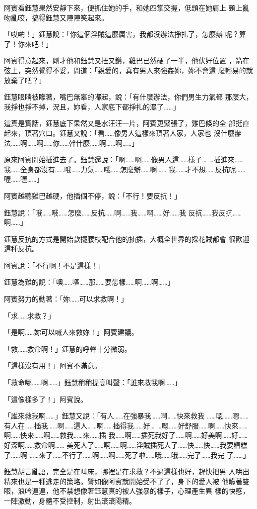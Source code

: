 阿賓看鈺慧果然安靜下來，便抓住她的手，和她四掌交握，低頭在她肩上
頸上亂吻亂咬，搞得鈺慧又陣陣笑起來。

「哎喲！」鈺慧說：「你這個淫賊這麼厲害，我都沒辦法掙扎了，怎麼辦
呢？算了！你來吧！」

阿賓得意起來，剛才他和鈺慧又扭又鑽，雞巴已然硬了一半，他伏好位置
，箭在弦上，突然覺得不妥，問道：「親愛的，真有男人來強姦妳，妳不會這
麼輕易的就放棄了吧？」

鈺慧眼睛被矇著，嘴巴無辜的嘟起，說：「有什麼辦法，你們男生力氣都
那麼大，我掙也掙不掉，況且，妳看，人家底下都掙扎的濕了……」

這真是實話，鈺慧底下果然又是水汪汪一片，阿賓更緊張了，雞巴倏的全
部挺直起來，頂著穴口。鈺慧又說：「看……像男人這樣來頂著人家，人家也
沒什麼辦法……啊……啊……你……幹什麼……啊……啊……」

原來阿賓開始插進去了。鈺慧還說：「啊……啊……像男人這……樣子…
…插進來……我……全身都沒有……哦……力氣……哦……怎麼辦……啊……
我……才不想……反抗呢……喔……喔……」

阿賓越聽雞巴越硬，他插個不停，說：「不行！要反抗！」

鈺慧說：「哦……哦……怎麼……反抗……啊……我……啊……好……我
反抗……我反抗……啊……」

鈺慧反抗的方式是開始款擺腰枝配合他的抽插，大概全世界的採花賊都會
很歡迎這種反抗。

阿賓說：「不行啊！不是這樣！」

鈺慧為難的說：「噢……嘔……那……要怎樣……啊……啊……」

阿賓努力的動著：「妳……可以求救啊！」

「求……求救？」

「是啊……妳可以喊人來救妳！」阿賓建議。

「救……救命啊！」鈺慧的呼聲十分微弱。

「這樣沒有用！」阿賓不滿意。

「救命哪……啊……」鈺慧稍稍提高叫聲：「誰來救我啊……」

「這像樣多了！」阿賓說。

「誰來救我啊……」鈺慧又說：「有人……在強暴我……啊……快來救我
……嗯……嗯……有人在……插我……啊……這人……啊……插得我……好…
…嗯……好舒服……啊……快來……啊……快來……啊……救我……來……插
我……啊……插死我好了……啊……好美啊……好……好深啊……救命啊……
美死人了……啊……啊……淫賊插死人了……快……快……我要糟糕了……啊
……來了……不行了……啊……啊……死了啦……哦……哦……完了……我完
了……」

鈺慧胡言亂語，完全是在叫床，哪裡是在求救？不過這樣也好，趕快把男
人哄出精來也是一種逃走的策略。譬如像阿賓就開始受不了了，身下的愛人被
他矇著雙眼，浪吟連連，他不禁想像著鈺慧真的被人強暴的樣子，心理產生異
樣的快感，一陣激動，身體不受控制，射出滾滾陽精。

